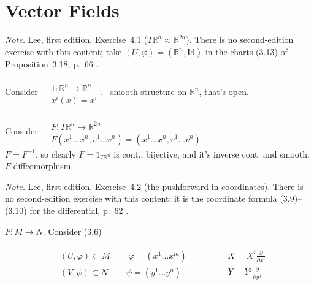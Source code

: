 \section{Vector Fields}





{\small\emph{Note.} Lee, first edition, Exercise~4.1 ($T\mathbb{R}^n\approx\mathbb{R}^{2n}$). There is no second-edition exercise with this content; take $(U,\varphi)=(\mathbb{R}^n,\mathrm{Id})$ in the charts (3.13) of Proposition~3.18, p.~66 \cite{dgdt:JLee2012}.}\par\noindent 
Consider $ \begin{aligned} & \quad \\ 
  & 1 : \mathbb{R}^n \to \mathbb{R}^n \\ & x^i(x) = x^i \end{aligned}$, \quad \, smooth structure on $\mathbb{R}^n$, that's open.  

Consider $\begin{aligned} & \quad \\ 
  & F: T\mathbb{R}^n \to \mathbb{R}^{2n} \\
& F(x^1 \dots x^n, v^1 \dots v^n ) = (x^1 \dots x^n, v^1 \dots v^n) \end{aligned}$ \\
$F= F^{-1}$, so clearly $F = 1_{T\mathbb{R}^n} $ is cont., bijective, and it's inverse cont. and smooth.  $F$ diffeomorphism.  

{\small\emph{Note.} Lee, first edition, Exercise~4.2 (the pushforward in coordinates). There is no second-edition exercise with this content; it is the coordinate formula (3.9)--(3.10) for the differential, p.~62 \cite{dgdt:JLee2012}.}\par\noindent  $F:M \to N$.  Consider (3.6)

\[
\begin{gathered}
  \begin{aligned}
    & (U , \varphi) \subset M \quad \quad \, \varphi = (x^1 \dots x^m) \\ 
    & (V, \psi ) \subset N \quad \quad \, \psi = (y^1 \dots y^n) 
\end{aligned}  \quad \quad \quad \, \begin{aligned} & X = X^i \frac{ \partial }{ \partial x^i } \\ 
    & Y = Y^j \frac{ \partial }{ \partial y^j } \end{aligned}
\end{gathered}
\]

